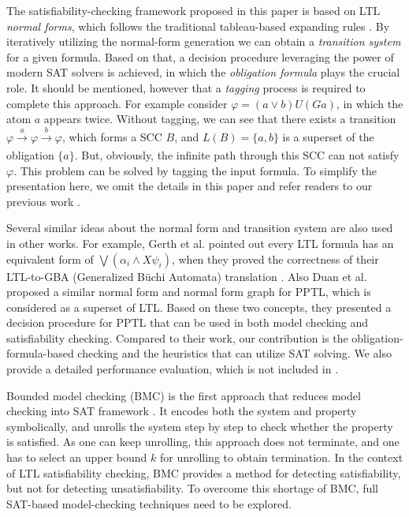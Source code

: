\documentclass[conference]{IEEEtran}
\def\phi{\varphi}
\newcommand{\tran}[1]{\xrightarrow[]{#1}}
\begin{document}
The satisfiability-checking framework proposed in this paper is based on LTL 
\textit{normal forms}, which follows the traditional tableau-based expanding 
rules \cite{GPVW95}. By iteratively utilizing the normal-form generation we can 
obtain a \textit{transition system} for a given formula. 
Based on that, a decision procedure leveraging the power of modern SAT solvers is 
achieved, in which the \textit{obligation formula} plays the crucial role. 
It should be mentioned, however that a \emph{tagging} process is required to 
complete this approach.  For example consider $\phi=(a \vee b) U (Ga)$, in which 
the atom $a$ appears twice.  Without tagging, we can see that there exists a transition
$\phi\tran{a}\phi\tran{b}\phi$, which forms a SCC $B$, and
$L(B)=\{a,b\}$ is a superset of the obligation $\{a\}$. 
But, obviously, the infinite path through this SCC can not satisfy
$\phi$. This problem can be solved by tagging the input formula. To simplify 
the presentation here, we omit the details in this paper and refer readers to 
our previous work \cite{LZPVH13}.
  
Several similar ideas about the normal form and transition system are also used 
in other works.  For example, Gerth et al. pointed out every LTL formula has an 
equivalent form of $\bigvee (\alpha_i\wedge X\psi_i)$, when they proved the correctness 
of their LTL-to-GBA (Generalized B\"uchi Automata) translation \cite{GPVW95}. 
Also Duan et al. proposed a similar normal form and normal form graph for PPTL, 
which is considered as a superset of LTL\cite{DTZ08}.  Based on these two concepts, 
they presented a decision procedure for PPTL that can be used in both model checking 
and satisfiability checking. Compared to their work, our contribution 
is the obligation-formula-based checking and the heuristics that can utilize SAT solving. 
We also provide a detailed performance evaluation, which is not included in \cite{DTZ08}.

Bounded model checking (BMC) is the first approach that reduces model checking into SAT 
framework \cite{CBRZ01,CPRS02}. It encodes both the system and property symbolically, and 
unrolls the system step by step to check whether the property is satisfied. As one can keep
unrolling, this approach does not terminate, and one has to select an upper bound
$k$ for unrolling to obtain termination. In the context of LTL satisfiability checking,
BMC provides a method for detecting satisfiability, but not for detecting unsatisfiability.
To overcome this shortage of BMC, full SAT-based model-checking techniques need to be explored. 
\end{document}

